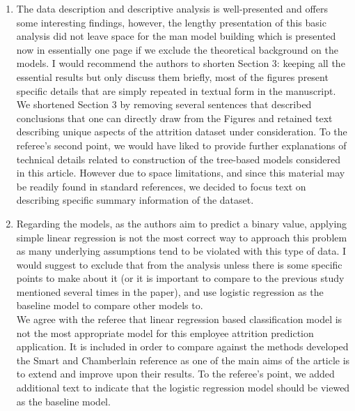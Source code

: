 \documentclass{amsart}[12pt]
\begin{document}
\begin{enumerate}
    \item   {\color{blue} 
        The data description and descriptive analysis is well-presented and offers some interesting findings, however, the lengthy presentation of this basic analysis did not leave space for the man model building which is presented now in essentially one page if we exclude the theoretical background on the models. I would recommend the authors to shorten Section 3: keeping all the essential results but only discuss them briefly, most of the figures present specific details that are simply repeated in textual form in the manuscript.
        }\\

        We shortened Section 3 by removing several sentences that described conclusions that one can 
        directly draw from the Figures and retained text describing unique aspects of the attrition 
        dataset under consideration.  To the referee's second point, we would have liked to provide 
        further explanations of technical details related to construction of the tree-based models 
        considered in this article.  However due to space limitations, and since this material may 
        be readily found in standard references, we decided to focus text on describing specific 
        summary information of the dataset. 
        
    \item   {\color{blue} 
        Regarding the models, as the authors aim to predict a binary value, applying simple linear regression is not the most correct way to approach this problem as many underlying assumptions tend to be violated with this type of data. I would suggest to exclude that from the analysis unless there is some specific points to make about it (or it is important to compare to the previous study mentioned several times in the paper), and use logistic regression as the baseline model to compare other models to. 
        }\\

        We agree with the referee that linear regression based classification model is not the 
        most appropriate model for this employee attrition prediction application. It is included in 
        order to compare against the methods developed the Smart and Chamberlain reference as one 
        of the main aims of the article is to extend and improve upon their results.  To the referee's 
        point, we added additional text to indicate that the logistic regression model should 
        be viewed as the baseline model.
        

\end{enumerate}
\end{document}
